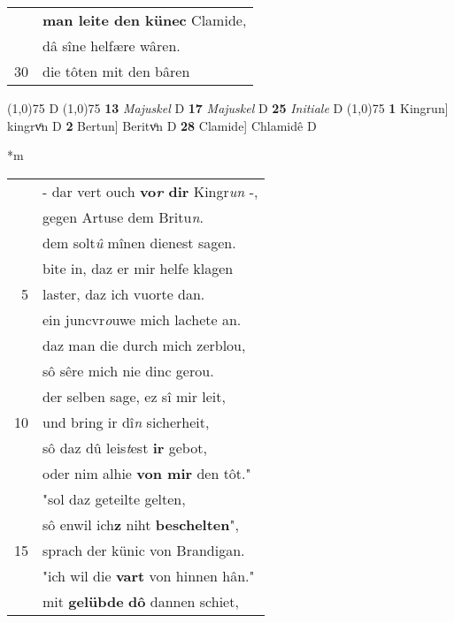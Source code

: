 \documentclass[8pt,a4paper,notitlepage]{article}
\begin{document}
\begin{table}[ht]
\begin{minipage}[t]{0.5\linewidth}
\begin{tabular}{rl}
 & \textbf{man leite den künec} Clamide,\\ 
 & dâ sîne helfære wâren.\\ 
30 & die tôten mit den bâren\\ 
\end{tabular}
\scriptsize
\line(1,0){75} \newline
D \newline
\line(1,0){75} \newline
\textbf{13} \textit{Majuskel} D  \textbf{17} \textit{Majuskel} D  \textbf{25} \textit{Initiale} D  \newline
\line(1,0){75} \newline
\textbf{1} Kingrun] kingrvͦn D \textbf{2} Bertun] Beritvͦn D \textbf{28} Clamide] Chlamidê D \newline
\end{minipage}
\hspace{0.5cm}
\begin{minipage}[t]{0.5\linewidth}
\small
\begin{center}*m
\end{center}
\begin{tabular}{rl}
 & - dar vert ouch \textbf{vo\textit{r} dir} Kingr\textit{un} -,\\ 
 & gegen Artuse dem Britu\textit{n}.\\ 
 & dem solt\textit{û} mînen dienest sagen.\\ 
 & bite in, daz er mir helfe klagen\\ 
5 & laster, daz ich vuorte dan.\\ 
 & ein juncvr\textit{o}uwe mich lachete an.\\ 
 & daz man die durch mich zerblou,\\ 
 & sô sêre mich nie dinc gerou.\\ 
 & der selben sage, ez sî mir leit,\\ 
10 & und bring ir dî\textit{n} sicherheit,\\ 
 & sô daz dû leis\textit{t}est \textbf{ir} gebot,\\ 
 & oder nim alhie \textbf{von mir} den tôt."\\ 
 & "sol daz geteilte gelten,\\ 
 & sô enwil ich\textbf{z} niht \textbf{beschelten}",\\ 
15 & sprach der künic von Brandigan.\\ 
 & "ich wil die \textbf{vart} von hinnen hân."\\ 
 & mit \textbf{gelübde} \textbf{dô} dannen schiet,\\ 

\end{tabular}
\end{minipage}
\end{table}
\end{document}

